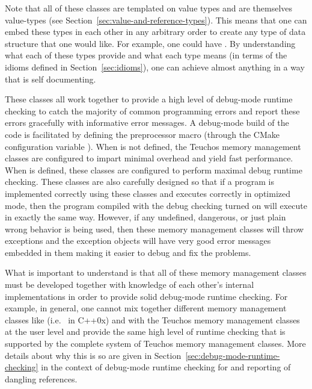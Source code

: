 \documentclass[pdf,ps2pdf,11pt]{SANDreport}
\begin{document}
Note that all of these classes are templated on value types and are
themselves value-types (see
Section~\ref{sec:value-and-reference-types}).  This means that one can
embed these types in each other in any arbitrary order to create any
type of data structure that one would like.  For example, one could
have {}.
By understanding what each of these types provide and what each type
means (in terms of the idioms defined in Section~\ref{sec:idioms}),
one can achieve almost anything in a way that is self documenting.

These classes all work together to provide a high level of debug-mode
runtime checking to catch the majority of common programming errors
and report these errors gracefully with informative error messages.  A
debug-mode build of the code is facilitated by defining the
preprocessor macro {} (through the CMake
configuration variable {}).  When
{} is not defined, the Teuchos memory management
classes are configured to impart minimal overhead and yield fast
performance.  When {} is defined, these classes
are configured to perform maximal debug runtime checking.  These
classes are also carefully designed so that if a program is
implemented correctly using these classes and executes correctly in
optimized mode, then the program compiled with the debug checking
turned on will execute in exactly the same way.  However, if any
undefined, dangerous, or just plain wrong behavior is being used, then
these memory management classes will throw exceptions and the
exception objects will have very good error messages embedded in them
making it easier to debug and fix the problems.

What is important to understand is that all of these memory management
classes must be developed together with knowledge of each other's
internal implementations in order to provide solid debug-mode runtime
checking.  For example, in general, one cannot mix together different
memory management classes like {} (i.e.\
{} in C++0x) and {} with the
Teuchos memory management classes at the user level and provide the
same high level of runtime checking that is supported by the complete
system of Teuchos memory management classes.  More details about why
this is so are given in Section~\ref{sec:debug-mode-runtime-checking}
in the context of debug-mode runtime checking for and reporting of
dangling references.
\end{document}
